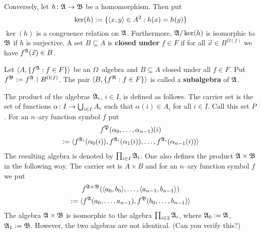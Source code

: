 Conversely, let $h \colon \mathfrak{A} \rightarrow \mathfrak{B}$ be a homomorphism.
Then put 
\index{$\ker$}%
\begin{equation}
\ker(h) := \{\langle x, y\rangle \in A^2 :  h(x) = h(y)\}
\end{equation}
$\ker(h)$ is a congruence relation on $\mathfrak{A}$. Furthermore,
$\mathfrak{A}/\ker(h)$ is isomorphic to $\mathfrak{B}$ if $h$ is surjective. 
A set $B \subseteq A$ is \textbf{closed under} $f \in F$ if for 
all $\vec{x} \in B^{\Omega(f)}$ we have $f^{\mathfrak{A}}(\vec{x}) \in B$.
\begin{defn}
Let $\langle A, \{f^{\mathfrak{A}} : f \in F\}\rangle$ be an
$\Omega$--algebra and $B \subseteq A$ closed under all
$f \in F$. Put $f^{\mathfrak{B}} := f^{\mathfrak{A}} \restriction B^{\Omega(f)}$.
The pair $\langle B, \{f^{\mathfrak{B}} : f \in F\}\rangle$ is called a
\textbf{subalgebra} of $\mathfrak{A}$.
\end{defn}
The product of the algebras $\mathfrak{A}_i$, $i \in I$, is defined as 
follows.  The carrier set is the set of functions $\alpha \colon I %
\pf \bigcup_{i \in I} A_i$ such that $\alpha(i) \in A_i$ for all 
$i \in I$. Call this set $P$. For an $n$--ary function symbol $f$ 
put
\begin{multline}
f^{\mathfrak{P}}(\alpha_0, \dotsc, \alpha_{n-1})(i)  \\
      := \langle f^{\mathfrak{A}_i}(\alpha_0(i)), f^{\mathfrak{A}_i}(\alpha_1(i)),
    \dotsc, f^{\mathfrak{A}_i}(\alpha_{n-1}(i))\rangle
\end{multline}
The resulting algebra is denoted by $\prod_{i \in I} \mathfrak{A}_i$.
One also defines the product $\mathfrak{A} \times \mathfrak{B}$ in the following
way. The carrier set is $A \times B$ and for an $n$--ary function
symbol $f$ we put
\begin{multline}
f^{\mathfrak{A}\times\mathfrak{B}}(\langle a_0,b_0\rangle, \dotsc, \langle a_{n-1}, b_{n-1}\rangle)
    \\
    := \langle f^{\mathfrak{A}}(a_0, \dotsc, a_{n-1}), f^{\mathfrak{B}}(b_0, \dotsc,
    b_{n-1})\rangle
\end{multline}
The algebra $\mathfrak{A}\times \mathfrak{B}$ is isomorphic to the algebra
$\prod_{i \in 2} \mathfrak{A}_i$, where $\mathfrak{A}_0 := \mathfrak{A}$, $\mathfrak{A}_1 := \mathfrak{B}$.
However, the two algebras are not identical. (Can you verify
this?)

